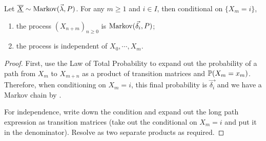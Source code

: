 \documentclass[../Main.tex]{subfiles}
\begin{document}
\begin{theorem}
    Let $\chain{X} \sim \Mkv{\vec{\lambda}}{P}$. For any $m \geq 1$ and $i \in I$, then conditional on $\{X_m = i\}$,
    \begin{enumerate}
        \item the process $(X_{n+m})_{n \geq 0}$ is $\Mkv{\vec{\delta_i}}{P}$;
        \item the process is independent of $X_0, \cdots, X_m$.
    \end{enumerate}
    \label{thmWeakMarkov}
\end{theorem}
\begin{proof}
    First, use the Law of Total Probability to expand out the probability of a path from $X_m$ to $X_{m+n}$ as a product of transition matrices and $\P(X_m = x_m)$. Therefore, when conditioning on $X_m = i$, this final probability is $\vec{\delta_i}$ and we have a Markov chain by .

    For independence, write down the condition and expand out the long path expression as transition matrices (take out the conditional on $X_m = i$ and put it in the denominator). Resolve as two separate products as required.
\end{proof}
\end{document}

